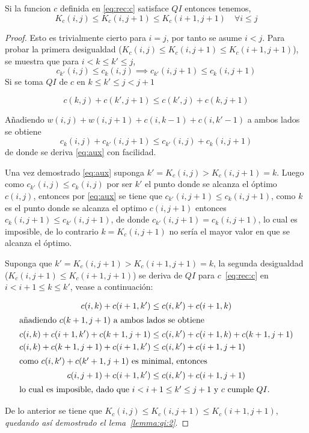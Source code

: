 \documentclass[spanish]{llncs}
\begin{document}
\begin{lemma}
	\label{lemma:qi:2}
	Si la funcion $c$ definida en \eqref{eq:rec:c} satisface $QI$ entonces tenemos,
	\begin{equation}
		\label{eq:qi:2}
		K_c(i,j) \le K_c(i,j+1) \le K_c(i+1,j+1) \quad \forall i \le j
	\end{equation}
\end{lemma}

\begin{proof}
	Esto es trivialmente cierto para $i=j$, por tanto se asume $i<j$. Para
	probar la primera desigualdad ($K_c(i,j) \le K_c(i,j+1) \le K_c(i+1,j+1)$),
	se muestra que para $i < k \le k' \le j$,
	\begin{equation}
		\label{eq:aux}
		c_{k'}(i,j) \le c_k(i,j) \implies c_{k'}(i,j+1) \le c_k(i,j+1)
	\end{equation}
	Si se toma $QI$ de $c$ en $k \le k' \le j < j+1$
							
	$$c(k,j) + c(k',j+1) \le c(k',j) + c(k,j+1)$$
							
	Añadiendo $w(i,j) + w(i,j+1) + c(i,k-1) + c(i,k'-1)$ a ambos lados se obtiene
	$$c_k(i,j) + c_{k'}(i,j+1) \le c_{k'}(i,j) + c_k(i,j+1)$$
	de donde se deriva \eqref{eq:aux} con facilidad.
							
	Una vez demostrado \eqref{eq:aux} suponga $k' = K_c(i,j) > K_c(i,j+1) = k$. Luego
	como $c_{k'}(i,j) \le c_k(i,j)$ por ser $k'$ el punto donde se alcanza el óptimo $c(i,j)$,
	entonces por \eqref{eq:aux} se tiene que $c_{k'}(i,j+1) \le c_k(i,j+1)$, como $k$
	es el punto donde se alcanza el optimo $c(i,j+1)$ entonces $c_k(i,j+1) \le c_{k'}(i,j+1)$,
	de donde $c_{k'}(i,j+1) = c_k(i,j+1)$, lo cual es imposible, de lo contrario $k=K_c(i,j+1)$
	no sería el mayor valor en que se alcanza el óptimo.
					
	Suponga que $k'=K_c(i,j+1) > K_c(i+1,j+1)=k$, la segunda desigualdad
	($K_c(i,j+1) \le K_c(i+1,j+1)$) se deriva de $QI$ para $c$~\eqref{eq:rec:c}
	en $i < i+1 \le k \le k'$, vease a continuación:
					
	\begin{align*}
		c(i,k) + c(i+1,k')              & \le c(i,k') + c(i+1, k)              \\
		\intertext{añadiendo $c(k+1,j+1)$ a ambos lados se obtiene}
		c(i,k) + c(i+1,k') + c(k+1,j+1) & \le c(i,k') + c(i+1, k) + c(k+1,j+1) \\
		c(i,k) + c(k+1,j+1) + c(i+1,k') & \le c(i,k') + c(i+1,j+1)             \\
		\intertext{como $c(i,k') + c(k'+1,j+1)$ es minimal, entonces}
		c(i,j+1) + c(i+1,k')            & \le c(i,k') + c(i+1,j+1)             \\
		\intertext{lo cual es imposible, dado que $i<i+1 \le k' \le j+1$ y $c$ cumple $QI$.}
	\end{align*}
				
	De lo anterior se tiene que $K_c(i,j) \le K_c(i,j+1) \le K_c(i+1,j+1)$,
	\emph{quedando así demostrado el lema~\ref{lemma:qi:2}}.
\end{proof}
\end{document}
